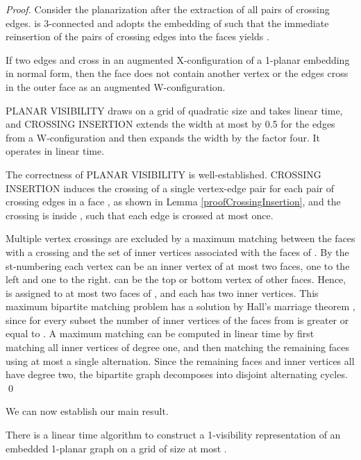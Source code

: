 \documentclass[runningheads]{llncs}
\begin{document}
\begin{proof}
Consider the planarization  after the
extraction of all pairs of crossing edges. 
is  3-connected   \cite{abk-sld3c-13} and  adopts the embedding of
 such that the immediate reinsertion of the pairs of
crossing edges into the faces yields .

If two edges  and  cross in an augmented
X-configuration of a 1-planar embedding in normal form, then the
face  does not contain another vertex  or the edges
cross in the outer face as an augmented W-configuration.

PLANAR VISIBILITY draws   on a grid of
quadratic size and takes linear time, and CROSSING INSERTION extends
the width at most by 0.5 for the edges from a W-configuration and
then expands the width by the factor four. It operates in linear
time.

The correctness of PLANAR VISIBILITY is well-established. CROSSING
INSERTION induces the crossing of a single vertex-edge pair for each
pair of crossing edges in a face , as shown in Lemma
\ref{proofCrossingInsertion}, and the crossing is inside , such
that each edge is crossed at most once.

Multiple vertex crossings are excluded by  a maximum matching
between the faces  with a crossing and the set of
 inner vertices  associated with the faces of .
By the st-numbering each vertex can be an inner vertex  of at
most two faces, one to the left and one to the right.  can be the
top or bottom vertex of   other faces. Hence,  is assigned to at
most two faces of , and each  has two inner vertices.
This maximum bipartite matching problem has a solution by Hall's
marriage theorem \cite{h-matching-35}, since for every subset  the number of inner vertices  of the faces from
 is greater or equal to . A maximum matching can be computed
in linear time by first matching all inner vertices of degree one,
and then matching the remaining faces using at most a single
alternation. Since the remaining faces and inner vertices all have
degree two, the bipartite graph decomposes into disjoint alternating
cycles. \qed
\end{proof}

\fi



We can now establish our main result.

\begin{theorem}

There is a linear time algorithm to construct a 1-visibility
representation of an embedded 1-planar graph on a grid of size at
most .
\end{theorem}
\end{document}
